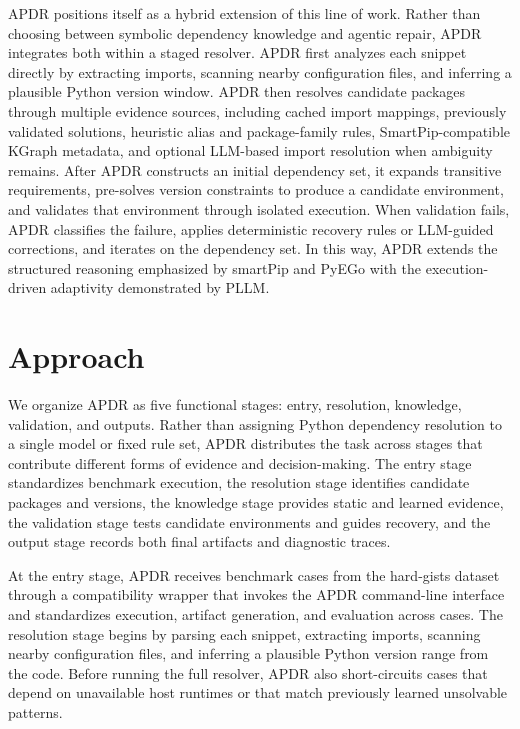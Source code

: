 \documentclass[conference]{IEEEtran}
\begin{document}
APDR positions itself as a hybrid extension of this line of work. Rather than choosing between symbolic dependency knowledge and agentic repair, APDR integrates both within a staged resolver. APDR first analyzes each snippet directly by extracting imports, scanning nearby configuration files, and inferring a plausible Python version window. APDR then resolves candidate packages through multiple evidence sources, including cached import mappings, previously validated solutions, heuristic alias and package-family rules, SmartPip-compatible KGraph metadata, and optional LLM-based import resolution when ambiguity remains. After APDR constructs an initial dependency set, it expands transitive requirements, pre-solves version constraints to produce a candidate environment, and validates that environment through isolated execution. When validation fails, APDR classifies the failure, applies deterministic recovery rules or LLM-guided corrections, and iterates on the dependency set. In this way, APDR extends the structured reasoning emphasized by smartPip and PyEGo with the execution-driven adaptivity demonstrated by PLLM.

\section{Approach}
We organize APDR as five functional stages: entry, resolution, knowledge, validation, and outputs. Rather than assigning Python dependency resolution to a single model or fixed rule set, APDR distributes the task across stages that contribute different forms of evidence and decision-making. The entry stage standardizes benchmark execution, the resolution stage identifies candidate packages and versions, the knowledge stage provides static and learned evidence, the validation stage tests candidate environments and guides recovery, and the output stage records both final artifacts and diagnostic traces.

At the entry stage, APDR receives benchmark cases from the hard-gists dataset through a compatibility wrapper that invokes the APDR command-line interface and standardizes execution, artifact generation, and evaluation across cases. The resolution stage begins by parsing each snippet, extracting imports, scanning nearby configuration files, and inferring a plausible Python version range from the code. Before running the full resolver, APDR also short-circuits cases that depend on unavailable host runtimes or that match previously learned unsolvable patterns.
\end{document}
